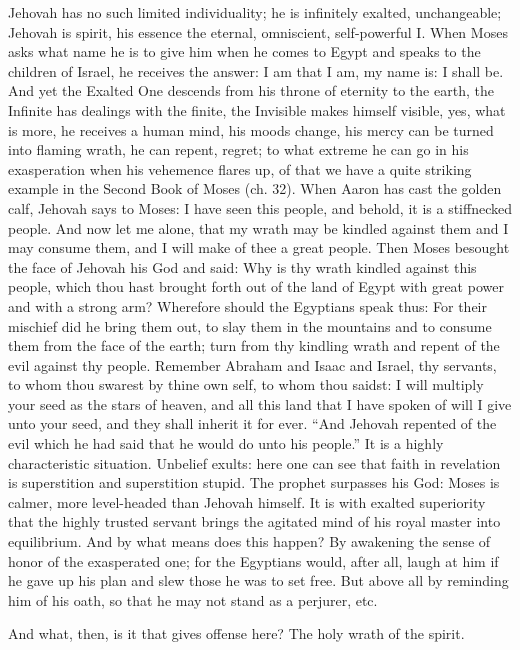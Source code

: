 \documentclass[12pt,a4paper,openany]{book}
\newcommand{\opage}[1]{\marginnote{\footnotesize\textit{[#1]}}}
\begin{document}
Jehovah has no such limited individuality; he is infinitely exalted, unchangeable; Jehovah is spirit, his essence the eternal, omniscient, self-powerful I. When Moses asks what name he is to give him when he comes to Egypt and speaks to the children of Israel, he receives the answer: I am that I am, my name is: I shall be. And yet the Exalted One descends from his throne of eternity to the earth, the Infinite has dealings with the finite, the Invisible makes himself visible, yes, what is more, he receives a human mind, his moods change, his mercy can be turned into flaming wrath, he can repent, regret; to what extreme he can go in his exasperation when his vehemence flares up, of that we have a quite striking example in
\setcounter{footnote}{0}%
\opage{54}the Second Book of Moses (ch. 32). When Aaron has cast the golden calf, Jehovah says to Moses: I have seen this people, and behold, it is a stiffnecked people. And now let me alone, that my wrath may be kindled against them and I may consume them, and I will make of thee a great people. Then Moses besought the face of Jehovah his God and said: Why is thy wrath kindled against this people, which thou hast brought forth out of the land of Egypt with great power and with a strong arm? Wherefore should the Egyptians speak thus: For their mischief did he bring them out, to slay them in the mountains and to consume them from the face of the earth; turn from thy kindling wrath and repent of the evil against thy people. Remember Abraham and Isaac and Israel, thy servants, to whom thou swarest by thine own self, to whom thou saidst: I will multiply your seed as the stars of heaven, and all this land that I have spoken of will I give unto your seed, and they shall inherit it for ever. ``And Jehovah repented of the evil which he had said that he would do unto his people.'' It is a highly characteristic situation. Unbelief exults: here one can see that faith in revelation is superstition and superstition stupid. The prophet surpasses his God: Moses is calmer, more level-headed than Jehovah himself. It is with exalted superiority that the highly trusted servant brings the agitated mind of his royal master into equilibrium. And by what means does this happen? By awakening the sense of honor of the exasperated one; for the Egyptians would, after all, laugh at him if he gave up his plan and slew those he was to set free. But above all by reminding him of his oath, so that he may not stand as a perjurer, etc.

\setcounter{footnote}{0}%
\opage{55}And what, then, is it that gives offense here? The holy wrath of the spirit.
\end{document}
